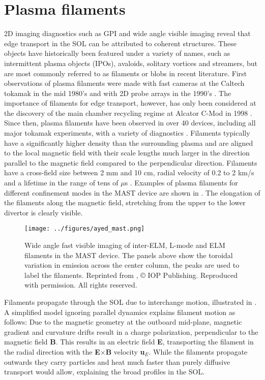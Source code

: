 \section{Plasma filaments}
2D imaging diagnostics such as GPI and wide angle visible imaging reveal that edge transport in the SOL can be attributed to coherent structures. These objects have historically been featured under a variety of names, such as intermittent plasma objects (IPOs), avaloids, solitary vortices and streamers, but are most commonly referred to as filaments or blobs in recent literature. First observations of plasma filaments were made with fast cameras at the Caltech tokamak in the mid 1980's \cite{zweben1985search,zweben1985structure,park1987sj} and with 2D probe arrays in the 1990's \cite{endler1995measurements,endler1999turbulent}. The importance of filaments for edge transport, however, has only been considered at the discovery of the main chamber recycling regime at Alcator C-Mod in 1998 \cite{umansky1998comments}. Since then, plasma filaments have been observed in over 40 devices, including all major tokamak experiments, with a variety of diagnostics \cite{d2011convective}. Filaments typically have a significantly higher density than the surrounding plasma and are aligned to the local magnetic field with their scale lengths much larger in the direction parallel to the magnetic field compared to the perpendicular direction. Filaments have a cross-field size
between 2 mm and 10 cm, radial velocity of 0.2 to 2 km/s and a lifetime in the range of tens of $\mu$s \cite{kirk2016mode,dudson2008experiments,zweben2002edge,kube2013blob,myra2006blob,boedo2001transport,silva2004fluctuation,carralero2015experimental,muller2009studies}. Examples of plasma filaments for different confinement modes in the MAST device are shown in . The elongation of the filaments along the magnetic field, stretching from the upper to the lower divertor is clearly visible.
\begin{figure}[t]
  \centering
  \texttt{[image: ../figures/ayed\_mast.png]}
  \caption{Wide angle fast visible imaging of inter-ELM, L-mode and ELM
    filaments in the MAST device. The panels above show the toroidal variation in emission across
    the center column, the peaks are used to label the filaments. Reprinted from \cite{ayed2009inter}, © IOP Publishing.  Reproduced with permission.  All rights reserved.}
  \label{Fig:ayed}
\end{figure}
Filaments propagate through the SOL due to interchange motion, illustrated in . A simplified model ignoring parallel dynamics explains filament motion as follows: Due to the magnetic geometry at the outboard mid-plane, magnetic gradient and curvature drifts result in a charge polarization, perpendicular to the magnetic field \textbf{B}. This results in an electric field \textbf{E}, transporting the filament in the radial direction with the \textbf{E}$\times$\textbf{B} velocity \textbf{u}$_E$. While the filaments propagate outwards they carry particles and heat much faster than purely diffusive transport would allow, explaining the broad profiles in the SOL.

